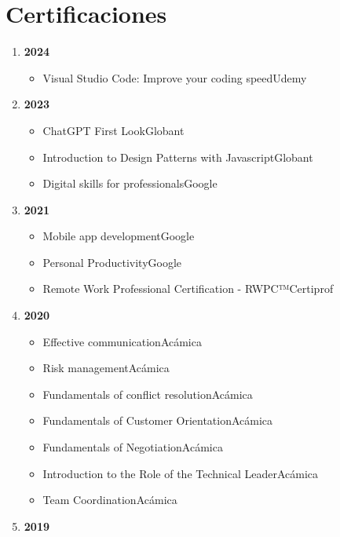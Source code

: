 \section{Certificaciones}
\begin{enumerate}[itemsep=0pt,label={},leftmargin=*]
  \item \textbf{2024}
    \begin{itemize}[label={},leftmargin=*]
        \item Visual Studio Code: Improve your coding speed\hfill Udemy
    \end{itemize}
  \item \textbf{2023}
    \begin{itemize}[label={},leftmargin=*]
        \item ChatGPT First Look\hfill Globant 
        \item Introduction to Design Patterns with Javascript\hfill Globant 
        \item Digital skills for professionals\hfill Google
    \end{itemize}
  \item \textbf{2021}
    \begin{itemize}[label={},leftmargin=*]
        \item Mobile app development\hfill Google 
        \item Personal Productivity\hfill Google 
        \item Remote Work Professional Certification - RWPC™\hfill Certiprof
    \end{itemize}
  \item \textbf{2020}
    \begin{itemize}[label={},leftmargin=*]
        \item Effective communication\hfill Acámica 
        \item Risk management\hfill Acámica 
        \item Fundamentals of conflict resolution\hfill Acámica 
        \item Fundamentals of Customer Orientation\hfill Acámica 
        \item Fundamentals of Negotiation\hfill Acámica 
        \item Introduction to the Role of the Technical Leader\hfill Acámica 
        \item Team Coordination\hfill Acámica
    \end{itemize}
  \item \textbf{2019}
    \begin{itemize}[label={},leftmargin=*]

\end{itemize}
\end{enumerate}

